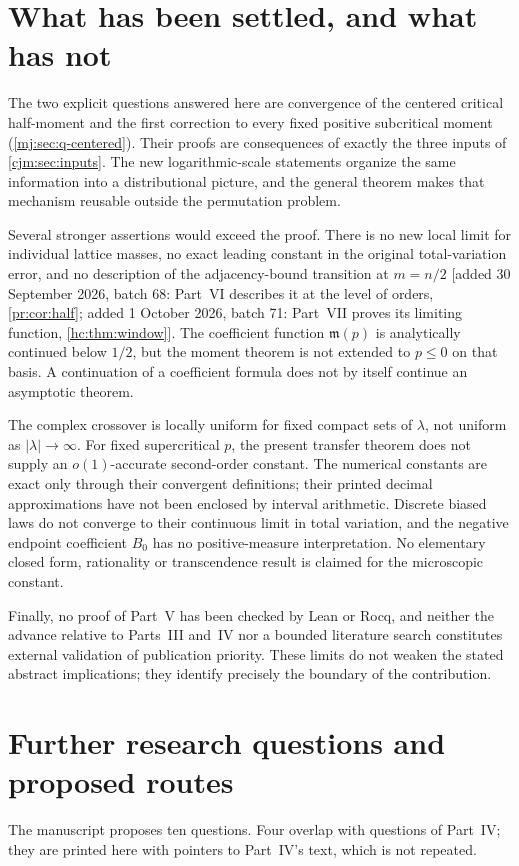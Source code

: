 \documentclass[11pt,a4paper]{article}
\theoremstyle{definition}\newaliascnt{definition}{theorem}
\theoremstyle{remark}\newaliascnt{remark}{theorem}
\begin{document}
\section{What has been settled, and what has not}
\label{cjm:sec:scope}
The two explicit questions answered here are convergence of the centered
critical half-moment and the first correction to every fixed positive
subcritical moment (\cref{mj:sec:q-centered}). Their proofs are consequences
of exactly the three inputs of \cref{cjm:sec:inputs}. The new
logarithmic-scale statements organize the same information into a
distributional picture, and the general theorem makes that mechanism reusable
outside the permutation problem.

Several stronger assertions would exceed the proof. There is no new local
limit for individual lattice masses, no exact leading constant in the
original total-variation error, and no description of the adjacency-bound
transition at $m=n/2$ [added 30 September 2026, batch 68: Part~VI describes
it at the level of orders, \cref{pr:cor:half}; added 1 October 2026,
batch 71: Part~VII proves its limiting function, \cref{hc:thm:window}]. The coefficient function $\mathfrak m(p)$ is
analytically continued below $1/2$, but the moment theorem is not extended
to $p\le0$ on that basis. A continuation of a coefficient formula does not
by itself continue an asymptotic theorem.

The complex crossover is locally uniform for fixed compact sets of
$\lambda$, not uniform as $|\lambda|\to\infty$. For fixed
supercritical $p$, the present transfer theorem does not supply an
$o(1)$-accurate second-order constant. The numerical constants are exact
only through their convergent definitions; their printed decimal
approximations have not been enclosed by interval arithmetic. Discrete
biased laws do not converge to their continuous limit in total variation,
and the negative endpoint coefficient $B_0$ has no positive-measure
interpretation. No elementary closed form, rationality or transcendence
result is claimed for the microscopic constant.

Finally, no proof of Part~V has been checked by Lean or Rocq, and neither
the advance relative to Parts~III and~IV nor a bounded literature search
constitutes external validation of publication priority. These limits do
not weaken the stated abstract implications; they identify precisely the
boundary of the contribution.

\section{Further research questions and proposed routes}
\label{cjm:sec:future}
The manuscript proposes ten questions. Four overlap with questions of
Part~IV; they are printed here with pointers to Part~IV's text, which is
not repeated.
\end{document}

